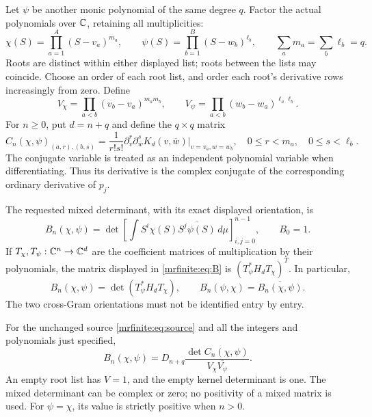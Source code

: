 \documentclass[11pt]{article}
\begin{document}
Let \(\psi\) be another monic polynomial of the same degree \(q\).
Factor the actual polynomials over \(\mathbb C\), retaining all multiplicities:
\[
 \chi(S)=\prod_{a=1}^{A}(S-v_a)^{m_a},\qquad
 \psi(S)=\prod_{b=1}^{B}(S-w_b)^{\ell_b},\qquad
 \sum_a m_a=\sum_b\ell_b=q.
\]
Roots are distinct within either displayed list; roots between the lists
may coincide. Choose an order of each root list, and order each root's
derivative rows increasingly from zero. Define
\begin{equation}\label{mrfinite:eq:V}
 V_\chi=\prod_{a<b}(v_b-v_a)^{m_am_b},\qquad
 V_\psi=\prod_{a<b}(w_b-w_a)^{\ell_a\ell_b}.
\end{equation}
For \(n\geq0\), put \(d=n+q\) and define the \(q\times q\) matrix
\begin{equation}\label{mrfinite:eq:C}
 C_n(\chi,\psi)_{(a,r),(b,s)}
  =\frac{1}{r!s!}
     \partial_v^r\partial_{\overline w}^{s}
           K_d(v,\overline w)\big|_{v=v_a,w=w_b},
 \quad 0\leq r<m_a,\quad0\leq s<\ell_b.
\end{equation}
The conjugate variable is treated as an independent polynomial variable
when differentiating. Thus its derivative is the complex conjugate of
the corresponding ordinary derivative of \(p_j\).

The requested mixed determinant, with its exact displayed orientation,
is
\begin{equation}\label{mrfinite:eq:B}
 B_n(\chi,\psi)=
 \det\left[\int S^i\chi(S)\overline{S^j\psi(S)}\,d\mu\right]_{i,j=0}^{n-1},
 \qquad B_0=1.
\end{equation}
If \(T_\chi,T_\psi:\mathbb C^n\to\mathbb C^d\) are the coefficient matrices of
multiplication by their polynomials, the matrix displayed in
\eqref{mrfinite:eq:B} is \((T_\psi^*H_dT_\chi)^T\). In particular,
\begin{equation}\label{mrfinite:eq:B-orientation}
 B_n(\chi,\psi)=\det(T_\psi^*H_dT_\chi),\qquad
 B_n(\psi,\chi)=\overline{B_n(\chi,\psi)}.
\end{equation}
The two cross-Gram orientations must not be identified entry by entry.

\begin{mrfinitetheorem}\label{mrfinite:thm:mixed}
For the unchanged source \eqref{mrfinite:eq:source} and all the integers and
polynomials just specified,
\begin{equation}\label{mrfinite:eq:main}
 \boxed{B_n(\chi,\psi)
   =D_{n+q}\frac{\det C_n(\chi,\psi)}{V_\chi\overline{V_\psi}}.}
\end{equation}
An empty root list has \(V=1\), and the empty kernel determinant is one.
The mixed determinant can be complex or zero; no positivity of a mixed
matrix is used. For \(\psi=\chi\), its value is strictly positive when
\(n>0\).
\end{mrfinitetheorem}
\end{document}
